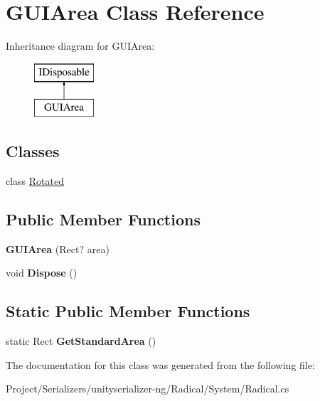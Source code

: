 \hypertarget{class_g_u_i_area}{}\section{G\+U\+I\+Area Class Reference}
\label{class_g_u_i_area}
Inheritance diagram for G\+U\+I\+Area\+:\begin{figure}[H]
\begin{center}
\leavevmode
\includegraphics[height=2.000000cm]{class_g_u_i_area}
\end{center}
\end{figure}
\subsection*{Classes}
\begin{DoxyCompactItemize}
\item 
class \hyperlink{class_g_u_i_area_1_1_rotated}{Rotated}
\end{DoxyCompactItemize}
\subsection*{Public Member Functions}
\begin{DoxyCompactItemize}
\item 
\mbox{\label{class_g_u_i_area_a1c687ef38e01337aa39c0b72d86e62eb}} 
{\bfseries G\+U\+I\+Area} (Rect? area)
\item 
\mbox{\label{class_g_u_i_area_a984f752358d120763927e638d90afd02}} 
void {\bfseries Dispose} ()
\end{DoxyCompactItemize}
\subsection*{Static Public Member Functions}
\begin{DoxyCompactItemize}
\item 
\mbox{\label{class_g_u_i_area_a0bcc0000d655b0b70cea49c88a843729}} 
static Rect {\bfseries Get\+Standard\+Area} ()
\end{DoxyCompactItemize}


The documentation for this class was generated from the following file\+:\begin{DoxyCompactItemize}
\item 
Project/\+Serializers/unityserializer-\/ng/\+Radical/\+System/Radical.\+cs\end{DoxyCompactItemize}

